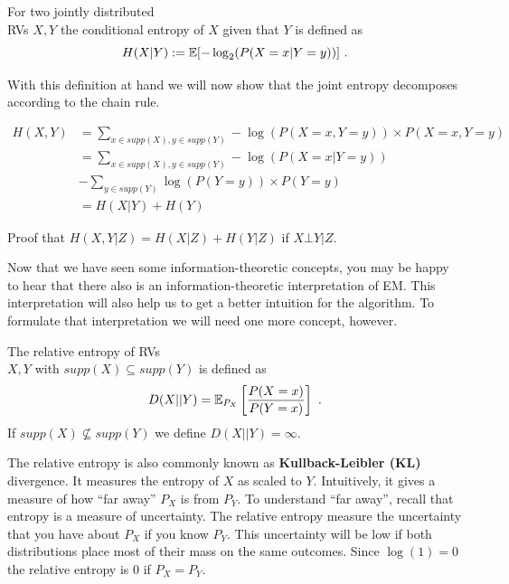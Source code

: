 \begin{Definition}
For two jointly distributed \\ RVs $ X,Y $ the conditional entropy of $ X $ given that $ Y $ is defined as
$$ H(X|Y) := \mathbb{E}[-\log_{2}(P(X=x|Y=y))] \ . $$
\end{Definition}

With this definition at hand we will now show that the joint entropy decomposes according to the
chain rule.

\begin{align}
H(X,Y) &= \underset{x \in supp(X), y \in supp(Y)}{\sum} -\log(P(X=x,Y=y)) \times P(X=x, Y=y) \\
&= \underset{x \in supp(X), y \in supp(Y)}{\sum} -\log(P(X=x| Y=y)) \\ &- \underset{y \in supp(Y)}{\sum}\log(P(Y=y)) \times P(Y=y) \nonumber \\
&= H(X|Y) + H(Y)
\end{align}

\begin{Exercise}
Proof that $ H(X,Y|Z) = H(X|Z) + H(Y|Z) $ if $ X \bot Y|Z $.
\end{Exercise}

Now that we have seen some information-theoretic concepts, you may be happy to hear that there also is an information-theoretic interpretation
of EM. This interpretation will also help us to get a better intuition for the algorithm. To formulate that interpretation we will need
one more concept, however.

\begin{Definition}
The relative entropy of RVs \\ $ X,Y $ with $ supp(X) \subseteq supp(Y) $ is defined as
$$ D(X||Y) = \mathbb{E}_{P_{X}}\left[\frac{P(X=x)}{P(Y=x)} \right] \ . $$
If $ supp(X) \not \subseteq supp(Y) $ we define $ D(X||Y) = \infty $.
\end{Definition}

The relative entropy is also commonly known as \textbf{Kullback-Leibler (KL)} divergence. It measures the entropy of $ X $ as scaled to $ Y $. Intuitively,
it gives a measure of how ``far away'' $ P_{X} $ is from $ P_{Y} $. To understand ``far away'', recall that entropy is a measure of uncertainty. The
relative entropy measure the uncertainty that you have about $ P_{X} $ if you know $ P_{Y} $. This uncertainty will be low if both distributions place most
of their mass on the same outcomes. Since $ \log(1) = 0 $ the relative entropy is 0 if $ P_{X} = P_{Y} $.

